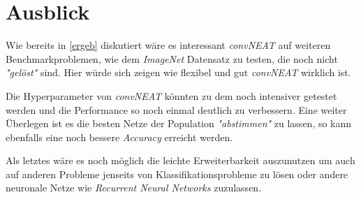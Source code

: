 \documentclass[]{scrartcl}
\begin{document}
	\clearpage

	\section{Ausblick}

		Wie bereits in \ref{ergeb} diskutiert wäre es interessant \textit{convNEAT} auf weiteren Benchmarkproblemen, wie dem \textit{ImageNet} Datensatz zu testen,
		die noch nicht \textit{"gelöst"} sind. Hier würde sich zeigen wie flexibel und gut \textit{convNEAT} wirklich ist.

		Die Hyperparameter von \textit{convNEAT} könnten zu dem noch intensiver getestet werden und die Performance so noch einmal deutlich zu verbessern.
		Eine weiter Überlegen ist es die besten Netze der Population \textit{"abstimmen"} zu lassen, so kann ebenfalls eine noch bessere \textit{Accuracy}
		erreicht werden.

		Als letztes wäre es noch möglich die leichte Erweiterbarkeit auszunutzen um auch auf anderen Probleme jenseits von Klassifikationsprobleme zu lösen oder andere
		neuronale Netze wie \textit{Recurrent Neural Networks} zuzulassen.

\clearpage

\printbibliography[heading=bibintoc, title={Referenzen}]
\end{document}
